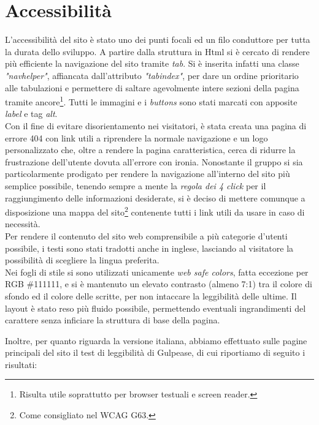 \section{Accessibilità}
\label{sec:access}
L'accessibilità del sito è stato uno dei punti focali ed un filo conduttore per tutta la durata dello sviluppo. A partire dalla struttura in Html si è cercato di rendere più efficiente la navigazione del sito tramite \emph{tab}. Si è inserita infatti una classe \emph{"navhelper"}, affiancata dall'attributo \emph{"tabindex"}, per dare un ordine prioritario alle tabulazioni e permettere di saltare agevolmente intere sezioni della pagina tramite ancore\footnote{Risulta utile soprattutto per browser testuali e screen reader.}. 
Tutti le immagini e i \emph{buttons} sono stati marcati con apposite \emph{label} e tag \emph{alt}.\\
Con il fine di evitare disorientamento nei visitatori, è stata creata una pagina di errore 404 con link utili a riprendere la normale navigazione e un logo personalizzato che, oltre a rendere la pagina caratteristica, cerca di ridurre la frustrazione dell'utente dovuta all'errore con ironia. Nonostante il gruppo si sia particolarmente prodigato per rendere la navigazione all'interno del sito più semplice possibile, tenendo sempre a mente la \emph{regola dei 4 click} per il raggiungimento delle informazioni desiderate, si è deciso di mettere comunque a disposizione una mappa del sito\footnote{Come consigliato nel WCAG G63.} contenente tutti i link utili da usare in caso di necessità.\\ 
Per rendere il contenuto del sito web comprensibile a più categorie d'utenti possibile, i testi sono stati tradotti anche in inglese, lasciando al visitatore la possibilità di scegliere la lingua preferita.\\
Nei fogli di stile si sono utilizzati unicamente \emph{web safe colors}, fatta eccezione per RGB \#111111, e si è mantenuto un elevato contrasto (almeno 7:1) tra il colore di sfondo ed il colore delle scritte, per non intaccare la leggibilità delle ultime. Il layout è stato reso più fluido possibile, permettendo eventuali ingrandimenti del carattere senza inficiare la struttura di base della pagina. 

\pagebreak
Inoltre, per quanto riguarda la versione italiana, abbiamo effettuato sulle pagine principali del sito il test di leggibilità di Gulpease, di cui riportiamo di seguito i risultati: \\

